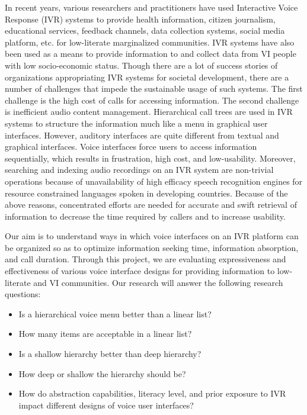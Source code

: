 \documentclass{sigchi}
\begin{document}
In recent years, various researchers and practitioners have used Interactive Voice Response (IVR) systems to provide health information, citizen journalism, educational services, feedback channels, data collection systems, social media platform, etc. for low-literate marginalized communities. IVR systems have also been used as a means to provide information to and collect data from VI people with low socio-economic status. Though there are a lot of success stories of organizations appropriating IVR systems for societal development, there are a number of challenges that impede the sustainable usage of such systems. The first challenge is the high cost of calls for accessing information. The second challenge is inefficient audio content management. Hierarchical call trees are used in IVR systems to structure the information much like a menu in graphical user interfaces. However, auditory interfaces are quite different from textual and graphical interfaces. Voice interfaces force users to access information sequentially, which results in frustration, high cost, and low-usability. Moreover, searching and indexing audio recordings on an IVR system are non-trivial operations because of unavailability of high efficacy speech recognition engines for resource constrained languages spoken in developing countries. Because of the above reasons, concentrated efforts are needed for accurate and swift retrieval of information to decrease the time required by callers and to increase usability. 

Our aim is to understand ways in which voice interfaces on an IVR platform can be organized so as to optimize information seeking time, information absorption, and call duration. Through this project, we are evaluating expressiveness and effectiveness of various voice interface designs for providing information to low-literate and VI communities. Our research will answer the following research questions:

\begin{itemize}
\item Is a hierarchical voice menu better than a linear list?
\item How many items are acceptable in a linear list?
\item Is a shallow hierarchy better than deep hierarchy?
\item How deep or shallow the hierarchy should be?
\item How do abstraction capabilities, literacy level, and prior exposure to IVR impact different designs of voice user interfaces? 
\end{itemize}
\end{document}
